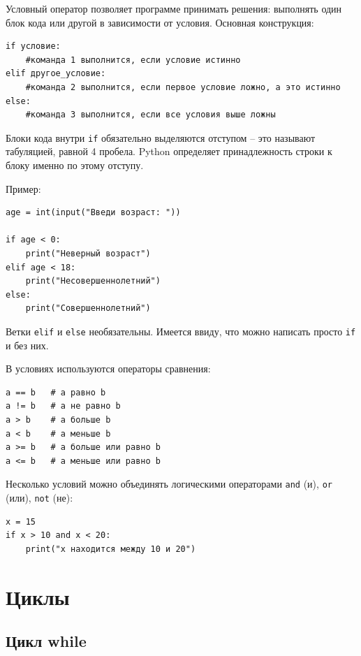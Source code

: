 \documentclass[12pt,a4paper]{article}
\begin{document}
Условный оператор позволяет программе принимать решения: выполнять один блок кода или другой в зависимости от условия. Основная конструкция:

\begin{verbatim}
if условие:
    #команда 1 выполнится, если условие истинно
elif другое_условие:
    #команда 2 выполнится, если первое условие ложно, а это истинно
else:
    #команда 3 выполнится, если все условия выше ложны
\end{verbatim}

Блоки кода внутри \texttt{if} обязательно выделяются отступом -- это называют табуляцией, равной 4 пробела. Python определяет принадлежность строки к блоку именно по этому отступу.
\medskip

Пример:

\begin{verbatim}
age = int(input("Введи возраст: "))

if age < 0:
    print("Неверный возраст")
elif age < 18:
    print("Несовершеннолетний")
else:
    print("Совершеннолетний")
\end{verbatim}

Ветки \texttt{elif} и \texttt{else} необязательны. Имеется ввиду, что можно написать просто \texttt{if} и без них.

\smallskip
\noindent В условиях используются операторы сравнения:

\begin{verbatim}
a == b   # a равно b
a != b   # a не равно b
a > b    # a больше b
a < b    # a меньше b
a >= b   # a больше или равно b
a <= b   # a меньше или равно b
\end{verbatim}

Несколько условий можно объединять логическими операторами \texttt{and} (и), \texttt{or} (или), \texttt{not} (не):

\begin{verbatim}
x = 15
if x > 10 and x < 20:
    print("x находится между 10 и 20")
\end{verbatim}

\section*{Циклы}
\subsection*{Цикл while}
\end{document}
